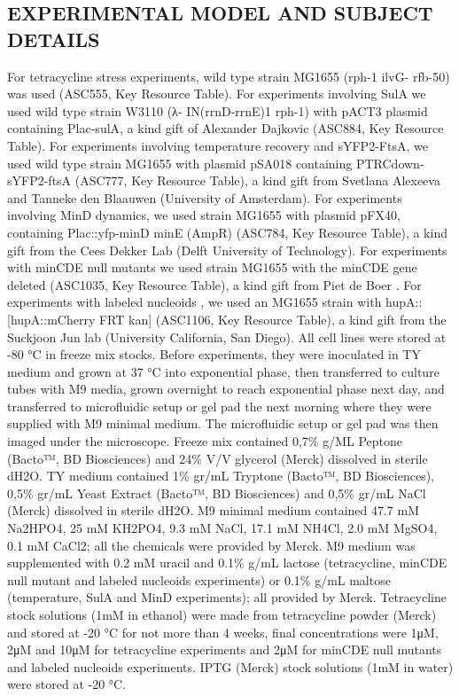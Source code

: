 \subsection{EXPERIMENTAL MODEL AND SUBJECT DETAILS}
For tetracycline stress experiments, wild type strain MG1655 (rph-1 ilvG- rfb-50) was used (ASC555, Key Resource Table). For experiments involving SulA we used wild type strain W3110 (λ- IN(rrnD-rrnE)1 rph-1) with pACT3 plasmid containing Plac-sulA, a kind gift of Alexander Dajkovic \cite{Dajkovic2008} (ASC884, Key Resource Table). For experiments involving temperature recovery and sYFP2-FtsA, we used wild type strain MG1655  with plasmid pSA018 containing PTRCdown-sYFP2-ftsA (ASC777, Key Resource Table), a kind gift from Svetlana Alexeeva and Tanneke den Blaauwen (University of Amsterdam). For experiments involving MinD dynamics, we used strain MG1655 with plasmid pFX40, containing Plac::yfp-minD minE (AmpR) (ASC784, Key Resource Table), a kind gift from the Cees Dekker Lab (Delft University of Technology). For experiments with minCDE null mutants we used strain MG1655 with the minCDE gene deleted  (ASC1035, Key Resource Table), a kind gift from Piet de Boer \cite{DeBoer1989}. For experiments with labeled nucleoids \cite{Wery2001}, we used an MG1655 strain with  hupA::[hupA::mCherry FRT kan] (ASC1106, Key Resource Table), a kind gift from the Suckjoon Jun lab (University California, San Diego).
All cell lines were stored at -80 °C in freeze mix stocks. Before experiments, they were inoculated in TY medium and grown at 37 °C into exponential phase, then transferred to culture tubes with M9 media, grown overnight to reach exponential phase next day, and transferred to microfluidic setup or gel pad the next morning where they were supplied with M9 minimal medium. The microfluidic setup or gel pad was then imaged under the microscope. Freeze mix contained 0,7\% g/ML Peptone (Bacto™, BD Biosciences) and 24\% V/V glycerol (Merck) dissolved in sterile dH2O. TY medium contained 1\% gr/mL Tryptone (Bacto™, BD Biosciences), 0,5\% gr/mL Yeast Extract (Bacto™, BD Biosciences) and 0,5\% gr/mL NaCl (Merck) dissolved in sterile dH2O. M9 minimal medium contained 47.7 mM Na2HPO4, 25 mM KH2PO4, 9.3 mM NaCl, 17.1 mM NH4Cl, 2.0 mM MgSO4, 0.1 mM CaCl2; all the chemicals were provided by Merck. M9 medium was supplemented with 0.2 mM uracil and 0.1\% g/mL lactose (tetracycline, minCDE null mutant and labeled nucleoids experiments) or 0.1\% g/mL maltose (temperature, SulA and MinD experiments); all provided by Merck. Tetracycline stock solutions (1mM in ethanol) were made from tetracycline powder (Merck) and stored at -20 °C for not more than 4 weeks, final concentrations were 1μM, 2μM and 10μM for tetracycline experiments and 2μM for minCDE null mutants and labeled nucleoids experiments. IPTG (Merck) stock solutions (1mM in water) were stored at -20 °C.

